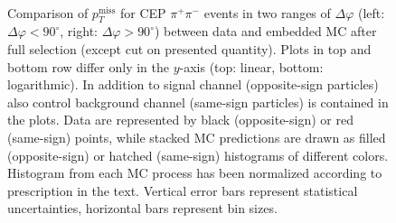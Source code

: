 \begin{figure}[h]
{\begin{subfigure}[b]{\linewidth}
  \end{subfigure}\\
  \begin{subfigure}[b]{\linewidth}\addtocounter{subfigure}{1}
  \end{subfigure} 
}\caption[Comparison of $p_{T}^{\text{miss}}$ for CEP $\pi^{+}\pi^{-}$ events in two ranges of $\Delta\varphi$ between data and embedded MC.]{Comparison of $p_{T}^{\text{miss}}$ for CEP $\pi^{+}\pi^{-}$ events in two ranges of $\Delta\varphi$ (left: $\Delta\varphi<90^{\circ}$, right: $\Delta\varphi>90^{\circ}$) between data and embedded MC after full selection (except cut on presented quantity). Plots in top and bottom row differ only in the $y$-axis (top: linear, bottom: logarithmic). In addition to signal channel (opposite-sign particles) also control background channel (same-sign particles) is contained in the plots. Data are represented by black (opposite-sign) or red (same-sign) points, while stacked MC predictions are drawn as filled (opposite-sign) or hatched (same-sign) histograms of different colors. Histogram from each MC process has been normalized according to prescription in the text. Vertical error bars represent statistical uncertainties, horizontal bars represent bin sizes.}\label{fig:Ratio_MissingPt_OppositeAndSameSign_DeltaPhiBins}%
\end{figure}



